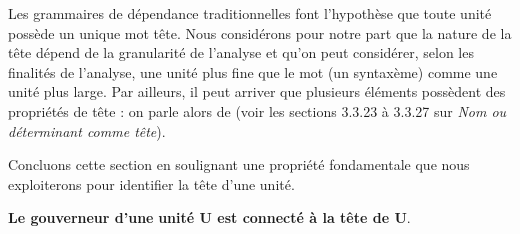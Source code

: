 Les grammaires de dépendance traditionnelles font l’hypothèse que toute unité possède un unique mot tête. Nous considérons pour notre part que la nature de la tête dépend de la granularité de l’analyse et qu’on peut considérer, selon les finalités de l’analyse, une unité plus fine que le mot (un syntaxème) comme une unité plus large. Par ailleurs, il peut arriver que plusieurs éléments possèdent des propriétés de tête : on parle alors de  (voir les sections 3.3.23 à 3.3.27 sur \textit{Nom ou déterminant comme tête}).

Concluons cette section en soulignant une propriété fondamentale que nous exploiterons pour identifier la tête d’une unité.

\begin{styleLivreImportant}
\textbf{Le gouverneur d’une} \textbf{unité U est connecté à la tête de U}.
\end{styleLivreImportant}

